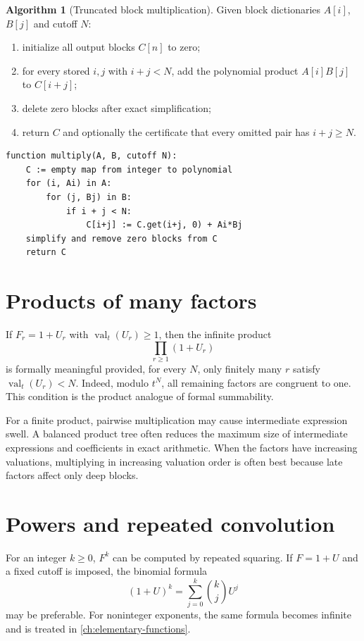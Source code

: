 \documentclass[11pt,openany]{book}
\theoremstyle{definition}
\newtheorem{algorithm}{Algorithm}[chapter]
\theoremstyle{plain}
\theoremstyle{remark}
\DeclareMathOperator{\val}{val}
\begin{document}
\begin{algorithm}[Truncated block multiplication]\label{alg:multiply}
Given block dictionaries \(A[i]\), \(B[j]\) and cutoff \(N\):
\begin{enumerate}
\item initialize all output blocks \(C[n]\) to zero;
\item for every stored \(i,j\) with \(i+j<N\), add the polynomial product \(A[i]B[j]\) to \(C[i+j]\);
\item delete zero blocks after exact simplification;
\item return \(C\) and optionally the certificate that every omitted pair has \(i+j\ge N\).
\end{enumerate}
\end{algorithm}

\begin{lstlisting}[style=pseudo,caption={Sparse truncated multiplication}]
function multiply(A, B, cutoff N):
    C := empty map from integer to polynomial
    for (i, Ai) in A:
        for (j, Bj) in B:
            if i + j < N:
                C[i+j] := C.get(i+j, 0) + Ai*Bj
    simplify and remove zero blocks from C
    return C
\end{lstlisting}

\section{Products of many factors}
If \(F_r=1+U_r\) with \(\val_t(U_r)\ge1\), then the infinite product
\begin{equation}\label{eq:formal-infinite-product}
 \prod_{r\ge1}(1+U_r)
\end{equation}
is formally meaningful provided, for every \(N\), only finitely many \(r\) satisfy \(\val_t(U_r)<N\). Indeed, modulo \(t^N\), all remaining factors are congruent to one. This condition is the product analogue of formal summability.

For a finite product, pairwise multiplication may cause intermediate expression swell. A balanced product tree often reduces the maximum size of intermediate expressions and coefficients in exact arithmetic. When the factors have increasing valuations, multiplying in increasing valuation order is often best because late factors affect only deep blocks.

\section{Powers and repeated convolution}
For an integer \(k\ge0\), \(F^k\) can be computed by repeated squaring. If \(F=1+U\) and a fixed cutoff is imposed, the binomial formula
\begin{equation}\label{eq:integer-binomial}
 (1+U)^k=\sum_{j=0}^{k}\binom{k}{j}U^j
\end{equation}
may be preferable. For noninteger exponents, the same formula becomes infinite and is treated in \cref{ch:elementary-functions}.
\end{document}
